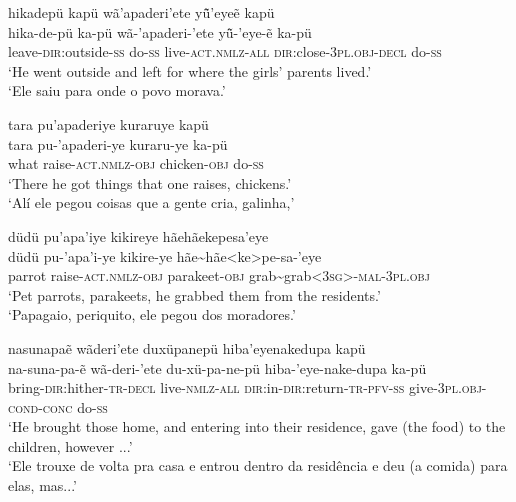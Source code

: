 \documentclass[output=paper,
modfonts,nonflat
]{langsci/langscibook}
\begin{document}
\newpage 
\ea hikadepü kapü wã'apaderi'ete yü̃'eyeẽ kapü \\[.3em]
\gll hika-de-pü ka-pü wã-'apaderi-'ete yü̃-'eye-ẽ ka-pü\\
leave-\textsc{dir:}outside-\textsc{ss} do-\textsc{ss} live-\textsc{act.nmlz-all} \textsc{dir:}close-\textsc{3pl.obj-decl} do-\textsc{ss}\\
\glt  `He went outside and left for where the girls' parents lived.' \\
`Ele saiu para onde o povo morava.' \\
\z  

\ea   tara pu'apaderiye kuraruye kapü\\[.3em]
\gll tara pu-'apaderi-ye kuraru-ye ka-pü\\
what raise-\textsc{act.nmlz-obj} chicken-\textsc{obj} do-\textsc{ss} \\
\glt   `There he got things that one raises, chickens.'  \\
`Alí ele pegou coisas que a gente cria, galinha,'
\z  

\ea   düdü pu'apa'iye kikireye hãehãekepesa'eye  \\[.3em]
\gll düdü pu-'apa'i-ye kikire-ye hãe\textasciitilde hãe<ke>pe-sa-'eye\\
parrot raise-\textsc{act.nmlz-obj} parakeet-\textsc{obj} grab\textasciitilde grab<\textsc{3sg>-mal-3pl.obj}\\
\glt   `Pet parrots, parakeets, he grabbed them from the residents.' \\
`Papagaio, periquito, ele pegou dos moradores.'\\
\z  

\ea   nasunapaẽ wãderi'ete duxüpanepü hiba'eyenakedupa kapü  \\[.3em]
\gll na-suna-pa-ẽ wã-deri-'ete du-xü-pa-ne-pü hiba-'eye-nake-dupa ka-pü\\
bring-\textsc{dir:}hither-\textsc{tr-decl} live-\textsc{nmlz-all} \textsc{dir:}in-\textsc{dir:}return-\textsc{tr-pfv-ss} give-\textsc{3pl.obj-cond-conc} do-\textsc{ss}  \\
\glt `He brought those home, and entering into their residence, gave (the food) to the children, however ...' \\
`Ele trouxe de volta pra casa e entrou dentro da residência e deu (a comida) para elas, mas...' \\
\z  
\end{document}
